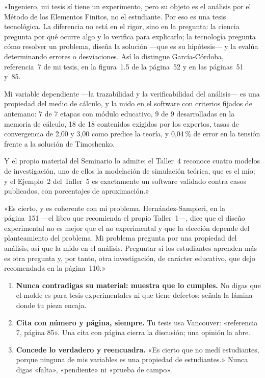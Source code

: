 \documentclass[11pt,a4paper]{article}
\begin{document}
\begin{decir}
«Ingeniero, mi tesis sí tiene un experimento, pero su objeto es el análisis por el Método de los Elementos Finitos, no el estudiante. Por eso es una tesis tecnológica. La diferencia no está en el rigor, sino en la pregunta: la ciencia pregunta por qué ocurre algo y lo verifica para explicarlo; la tecnología pregunta cómo resolver un problema, diseña la solución ---que es su hipótesis--- y la evalúa determinando errores o desviaciones. Así lo distingue García-Córdoba, referencia~7 de mi tesis, en la figura~1.5 de la página~52 y en las páginas~51 y~85.

Mi variable dependiente ---la trazabilidad y la verificabilidad del análisis--- es una propiedad del medio de cálculo, y la mido en el software con criterios fijados de antemano: 7 de 7 etapas con módulo educativo, 9 de 9 desarrolladas en la memoria de cálculo, 18 de 18 contenidos exigidos por los expertos, tasas de convergencia de 2,00 y 3,00 como predice la teoría, y 0,04\,\% de error en la tensión frente a la solución de Timoshenko.

Y el propio material del Seminario lo admite: el Taller~4 reconoce cuatro modelos de investigación, uno de ellos la modelación de simulación teórica, que es el mío; y el Ejemplo~2 del Taller~5 es exactamente un software validado contra casos publicados, con porcentajes de aproximación.»
\end{decir}

\begin{decir}
«Es cierto, y es coherente con mi problema. Hernández-Sampieri, en la página~151 ---el libro que recomienda el propio Taller~1---, dice que el diseño experimental no es mejor que el no experimental y que la elección depende del planteamiento del problema. Mi problema pregunta por una propiedad del análisis, así que la mido en el análisis. Preguntar si los estudiantes aprenden más es otra pregunta y, por tanto, otra investigación, de carácter educativo, que dejo recomendada en la página~110.»
\end{decir}

\begin{cuidado}
\begin{enumerate}[leftmargin=1.4em]
\item \textbf{Nunca contradigas su material: muestra que lo cumples.} No digas que el molde es para tesis experimentales ni que tiene defectos; señala la lámina donde tu pieza encaja.
\item \textbf{Cita con número y página, siempre.} Tu tesis usa Vancouver: «referencia 7, página 85». Una cita con página cierra la discusión; una opinión la abre.
\item \textbf{Concede lo verdadero y reencuadra.} «Es cierto que no medí estudiantes, porque ninguna de mis variables es una propiedad de estudiantes.» Nunca digas «falta», «pendiente» ni «prueba de campo».
\end{enumerate}
\end{cuidado}
\end{document}
